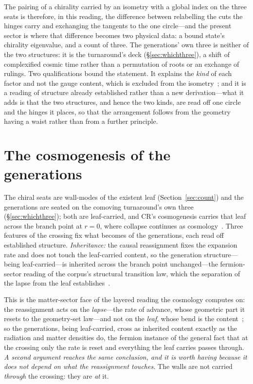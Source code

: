 \documentclass[11pt]{article}
\begin{document}
The pairing of a chirality carried by an isometry with a global index on the three seats is therefore, in this reading, the difference between relabelling the cuts the hinges carry and exchanging the tangents to the one circle---and the present sector is where that difference becomes two physical data: a bound state's chirality eigenvalue, and a count of three. The generations' own three is neither of the two structures: it is the turnaround's deck (\S\ref{sec:whichthree}), a shift of complexified cosmic time rather than a permutation of roots or an exchange of rulings. Two qualifications bound the statement. It explains the \emph{kind} of each factor and not the gauge content, which is excluded from the isometry~\cite{JanzenBoundary}; and it is a reading of structure already established rather than a new derivation---what it adds is that the two structures, and hence the two kinds, are read off one circle and the hinges it places, so that the arrangement follows from the geometry having a waist rather than from a further principle.

\section{The cosmogenesis of the generations}\label{sec:cosmogenesis}

The chiral seats are wall-modes of the existent leaf (Section~\ref{sec:count}) and the generations are seated on the comoving turnaround's own three (\S\ref{sec:whichthree}); both are leaf-carried, and CR's cosmogenesis carries that leaf across the branch point at $r=0$, where collapse continues as cosmology~\cite{JanzenBoundary,JanzenCRframework}. Three features of the crossing fix what becomes of the generations, each read off established structure. \emph{Inheritance:} the causal reassignment fixes the expansion rate and does not touch the leaf-carried content, so the generation structure---being leaf-carried---is inherited across the branch point unchanged---the fermion-sector reading of the corpus's structural transition law, which the separation of the lapse from the leaf establishes~\cite{JanzenOperator}. 

This is the matter-sector face of the layered reading the cosmology computes on: the reassignment acts on the \emph{lapse}---the rate of advance, whose geometric part it resets to the geometry-set law---and not on the \emph{leaf}, whose bend is the content~\cite{JanzenOperator,JanzenCRframework}; so the generations, being leaf-carried, cross as inherited content exactly as the radiation and matter densities do, the fermion instance of the general fact that at the crossing only the rate is reset and everything the leaf carries passes through. \emph{A second argument reaches the same conclusion, and it is worth having because it does not depend on
what the reassignment touches.} The walls are not carried \emph{through} the crossing:
they are \emph{at} it. 
\end{document}
